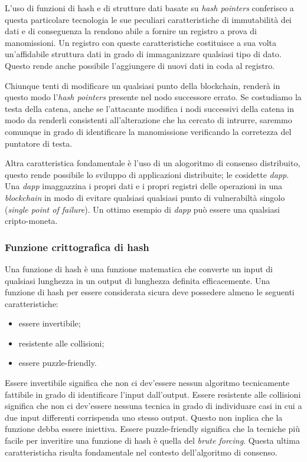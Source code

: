 L'uso di funzioni di hash e di strutture dati basate su \emph{hash pointers} conferisco a questa particolare tecnologia le sue peculiari caratteristiche di immutabilità dei dati e di conseguenza la rendono abile a fornire un registro a prova di manomissioni. Un registro con queste caratteristiche costituisce a sua volta un'affidabile struttura dati in grado di immaganizzare qualsiasi tipo di dato. Questo rende anche possibile l'aggiungere di nuovi dati in coda al registro. 

Chiunque tenti di modificare un qualsiasi punto della blockchain, renderà in questo modo l'\emph{hash pointers} presente nel nodo successore errato. Se costudiamo la testa della catena, anche se l'attacante modifica i nodi successivi della catena in modo da renderli consistenti all'alterazione che ha cercato di intrurre, saremmo comunque in grado di identificare la manomissione verificando la corretezza del puntatore di testa.

Altra caratteristica fondamentale è l'uso di un alogoritmo di consenso distribuito, questo rende possibile lo sviluppo di applicazioni distribuite; le cosidette \emph{dapp}. Una \emph{dapp} imaggazzina i propri dati e i propri registri delle operazioni in una \emph{blockchain} in modo di evitare qualsiasi qualsiasi punto di vulnerabiltà singolo (\emph{single point of failure}). Un ottimo esempio di \emph{dapp} può essere una qualsiasi cripto-moneta.

\subsubsection{Funzione crittografica di hash}
Una funzione di hash è una funzione matematica che converte un input di qualsiasi lunghezza in un output di lunghezza definita efficacemente. Una funzione di hash per essere considerata sicura deve possedere almeno le seguenti caratteristiche:
\begin{itemize}
    \item essere invertibile;
    \item resistente alle collisioni;
    \item essere puzzle-friendly.
\end{itemize}
Essere invertibile significa che non ci dev'essere nessun algoritmo tecnicamente fattibile in grado di identificare l'input dall'output.
Essere resistente alle collisioni significa che non ci dev'essere nessuna tecnica in grado di individuare casi in cui a due input differenti corrispenda uno stesso output. Questo non inplica che la funzione debba essere iniettiva.
Essere puzzle-friendly significa che la tecniche più facile per inveritire una funzione di hash è quella del \emph{brute forcing}. Questa ultima caratteristicha risulta fondamentale nel contesto dell'algoritmo di consenso.

